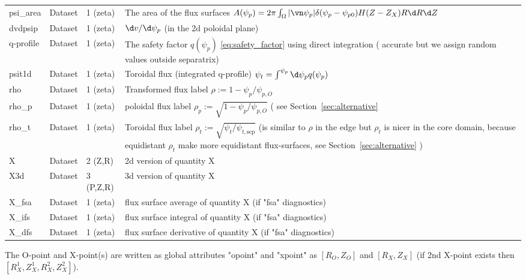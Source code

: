 \begin{longtable}{lll>{\RaggedRight}p{7cm}}
psi\_area        & Dataset & 1 (zeta) & The area of the flux surfaces $A(\psi_p) = 2\pi \int_\Omega |\vn\psi_p| \delta(\psi_p - \psi_{p0}) H(Z-Z_X) R\d R\d Z$ \\
dvdpsip          & Dataset & 1 (zeta) & $\d v/\d\psi_p$ (in the 2d poloidal plane) \\
q-profile        & Dataset & 1 (zeta) & The safety factor $q(\psi_p)$ \eqref{eq:safety_factor} using direct integration ( accurate but we assign random values outside separatrix) \\
psit1d           & Dataset & 1 (zeta) & Toroidal flux (integrated q-profile) $\psi_t = \int^{\psi_p} \d\psi_p q(\psi_p)$ \\
rho              & Dataset & 1 (zeta) & Transformed flux label $\rho:= 1 - \psi_p/\psi_{p,O}$ \\
rho\_p           & Dataset & 1 (zeta) & poloidal flux label $\rho_p:= \sqrt{1 - \psi_p/\psi_{p,O}}$  ( see Section~\ref{sec:alternative}\\
rho\_t           & Dataset & 1 (zeta) & Toroidal flux label $\rho_t :=
\sqrt{\psi_t/\psi_{t,\mathrm{sep}}}$ (is similar to $\rho$ in the edge but
$\rho_t$ is nicer in the core domain, because equidistant $\rho_t$ make
more equidistant flux-surfaces, see Section~\ref{sec:alternative} )\\
X      & Dataset & 2 (Z,R) & 2d version of quantity X \\
X3d    & Dataset & 3 (P,Z,R) & 3d version of quantity X \\
X\_fsa & Dataset & 1 (zeta) & flux surface average of quantity X (if "fsa" diagnostics)\\
X\_ifs & Dataset & 1 (zeta) & flux surface integral of quantity X (if "fsa" diagnostics)\\
X\_dfs & Dataset & 1 (zeta) & flux surface derivative of quantity X (if "fsa" diagnostics)\\
\bottomrule
\end{longtable}

The O-point and X-point(s) are written as global attributes "opoint" and "xpoint" as $[R_O,Z_O]$ and $[R_X,Z_X]$ (if 2nd X-point exists then $[R^1_X,Z^1_X,R^2_X,Z^2_X]$).

